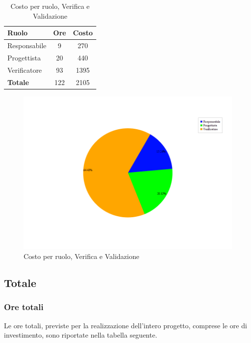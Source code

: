 \begin{table}[H]
	\begin{center}
		\begin{tabular}{|l|c|c|}
			\hline
			\textbf{Ruolo}	& \textbf{Ore} &	\textbf{Costo}	 \\
			\hline
			Responsabile	&	9	&	270		\\
			\hline
			Progettista		&	20	&	440		\\
			\hline
			Verificatore	&	93	&	1395	\\
			\hline
			\textbf{Totale}	&	122	&	2105	\\
			\hline
		\end{tabular}
	\end{center}
	\caption{Costo per ruolo, Verifica e Validazione}
\end{table}

\begin{figure}[H]
	\centering
	\includegraphics[scale=0.4]{immagini/Grafi/CostoVV}
	\caption{Costo per ruolo, Verifica e Validazione}
\end{figure}

\subsection{Totale}
\subsubsection{Ore totali}
Le ore totali, previste per la realizzazione dell'intero progetto, comprese le ore di investimento, sono riportate nella tabella seguente.


